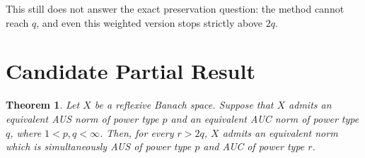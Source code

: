 \documentclass[11pt]{article}
\newtheorem{theorem}{Theorem}
\begin{document}
This still does not answer the exact preservation question: the method cannot
reach $q$, and even this weighted version stops strictly above $2q$.

\section*{Candidate Partial Result}

\begin{theorem}
Let $X$ be a reflexive Banach space. Suppose that $X$ admits an equivalent
AUS norm of power type $p$ and an equivalent AUC norm of power type $q$, where
$1<p,q<\infty$. Then, for every $r>2q$, $X$ admits an equivalent norm which is
simultaneously AUS of power type $p$ and AUC of power type $r$.
\end{theorem}
\end{document}
